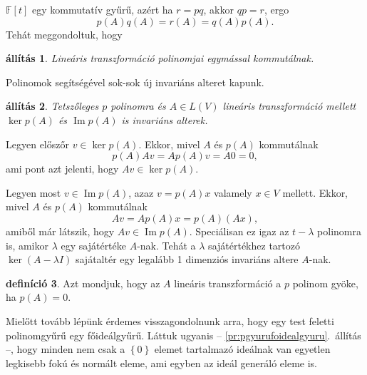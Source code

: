 \documentclass[9pt, a4paper, showtrims]{memoir}
\makeatletter
\renewenvironment{proof}[1][\proofname]
    {\par\pushQED{\qed}%
    \normalfont \topsep6\p@\@plus6\p@\relax
    \trivlist
    \item[\hskip\labelsep
        \itshape
    #1\@addpunct{:}]\ignorespaces}
    {\popQED\endtrivlist\@endpefalse}
\theoremstyle{plain}
\newtheorem{proposition}{állítás}[chapter]
\theoremstyle{remark}
\theoremstyle{definition}
\newtheorem{definition}[proposition]{definíció}
\DeclareMathOperator{\im}{Im}
\makeatother
\begin{document}
$\mathbb{F}\left[ t \right]$ egy kommutatív gyűrű,
azért ha $r=pq$, akkor $qp=r$,
ergo
\[
	p\left( A \right)q\left( A \right)=r\left( A \right)=q\left( A \right)p\left( A \right).
\]
Tehát meggondoltuk, hogy
\begin{proposition}
	Lineáris transzformáció polinomjai egymással kommutálnak.
\end{proposition}
Polinomok segítségével sok-sok új invariáns alteret kapunk.
\begin{proposition}
	Tetszőleges $p$ polinomra és $A\in L\left( V \right)$
	lineáris transzformáció mellett
	$\ker p\left( A \right)$ és $\im p\left( A \right)$ is invariáns alterek.
\end{proposition}
\begin{proof}
	Legyen előszőr $v\in\ker p\left( A \right)$.
	Ekkor, mivel $A$ és $p\left( A \right)$ kommutálnak
	\[
		p\left( A \right)Av=Ap\left( A \right)v=A0=0,
	\]
	ami pont azt jelenti, hogy $Av\in\ker p\left( A \right)$.

	Legyen most $v\in\im p\left( A \right)$,
	azaz
	$v=p\left( A \right)x$ valamely $x\in V$ mellett.
	Ekkor, mivel $A$ és $p\left( A \right)$ kommutálnak
	\[
		Av=Ap\left( A \right)x=p\left( A \right)\left( Ax \right),
	\]
	amiből már látszik, hogy $Av\in\im p\left( A \right)$.
\end{proof}
Speciálisan ez igaz az $t-\lambda$ polinomra is,
amikor $\lambda$
egy sajátértéke $A$-nak. Tehát a $\lambda$ sajátértékhez tartozó
$\ker \left( A-\lambda I \right)$ sajátaltér egy legalább 1 dimenziós invariáns altere
$A$-nak.
\begin{definition}
	Azt mondjuk, hogy az $A$ lineáris transzformáció a $p$ polinom gyöke,
	ha $p\left( A \right)=0$.
\end{definition}
Mielőtt tovább lépünk érdemes visszagondolnunk arra,
hogy egy test feletti polinomgyűrű egy főideálgyűrű.
Láttuk ugyanis
-- \ref{pr:pgyurufoidealgyuru}.~állítás --,
hogy minden nem csak a $\left\{ 0 \right\}$ elemet tartalmazó ideálnak
van egyetlen legkisebb fokú és normált eleme,
ami egyben az ideál generáló eleme is.
\end{document}
